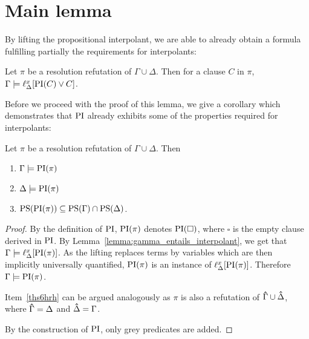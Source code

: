 \section{Main lemma}


By lifting the propositional interpolant, we are able to already obtain a formula fulfilling partially the requirements for interpolants:



\begin{lemma}
	Let $\pi$ be a resolution refutation of $\Gamma \cup \Delta$.
	Then for a clause $C$ in $\pi$,
	$ \Gamma \entails \lifdelta{\PI(C) \lor\nolinebreak C} $.
	\label{lemma:gamma_entails_interpolant}
\end{lemma}

Before we proceed with the proof of this lemma, we give a corollary which demonstrates that $\operatorname{PI}$ already exhibits some of the properties required for interpolants:

\begin{cor}
	Let $\pi$ be a resolution refutation of $\Gamma \cup \Delta$.
	Then
	\begin{enumerate}
		\item$\Gamma\models \operatorname{PI}(\pi)$
		\item$\Delta\models \operatorname{PI}(\pi)$
			\label{ths6hrh}
		\item $\operatorname{PS}(\operatorname{PI}(\pi)) \subseteq \operatorname{PS}(\Gamma) \cap \operatorname{PS}(\Delta)$.
		\end{enumerate}
\end{cor}
\begin{proof}
	By the definition of $\operatorname{PI}$, 
	$\operatorname{PI}(\pi)$ denotes $\operatorname{PI}(\square)$, where $\square$ is the empty clause derived in $\operatorname{PI}$.
	By Lemma~\ref{lemma:gamma_entails_interpolant}, we get that 
	$ \Gamma \models \ell_{\Delta}^{x}[\operatorname{PI}(\pi)]$.
	As the lifting replaces terms by variables which are then implicitly universally quantified, $\operatorname{PI}(\pi)$ is an instance of $\ell_{\Delta}^{x}[\operatorname{PI}(\pi)]$.
	Therefore $\Gamma \models \operatorname{PI}(\pi)$.

	Item~\ref{ths6hrh} can be argued analogously as $\pi$ is also a refutation of $\bm\hat \Gamma \cup \bm\hat \Delta$, where $\bm\hat\Gamma = \Delta$ and $\bm\hat\Delta = \Gamma$.

	By the construction of $\operatorname{PI}$, only grey predicates are added.
\end{proof}

